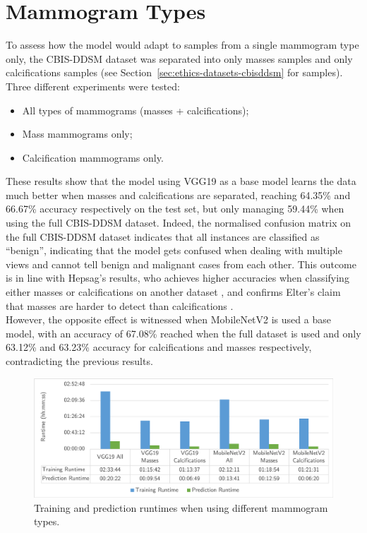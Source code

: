 \section{Mammogram Types}

To assess how the model would adapt to samples from a single mammogram type only, the CBIS-DDSM dataset was separated into only masses samples and only calcifications samples (see Section~\ref{sec:ethics-datasets-cbisddsm} for samples). Three different experiments were tested:
\begin{itemize}
    \item All types of mammograms (masses + calcifications);
    \item Mass mammograms only;
    \item Calcification mammograms only.
\end{itemize}



These results show that the model using VGG19 as a base model learns the data much better when masses and calcifications are separated, reaching 64.35\% and 66.67\% accuracy respectively on the test set, but only managing 59.44\% when using the full CBIS-DDSM dataset. Indeed, the normalised confusion matrix on the full CBIS-DDSM dataset indicates that all instances are classified as ``benign'', indicating that the model gets confused when dealing with multiple views and cannot tell benign and malignant cases from each other. This outcome is in line with Hepsag's results, who achieves higher accuracies when classifying either masses or calcifications on another dataset \citep{Hepsag2017}, and confirms Elter's claim that masses are harder to detect than calcifications \citep{Elter2009}.\\

However, the opposite effect is witnessed when MobileNetV2 is used a base model, with an accuracy of 67.08\% reached when the full dataset is used and only 63.12\% and 63.23\% accuracy for calcifications and masses respectively, contradicting the previous results.

\begin{figure}[ht]
\centerline{\includegraphics[width=\textwidth]{figures/evaluation/mammogram_type_experiment/runtimes.png}}
\caption{\label{fig:evaluation-mammogram_type_experiment-runtimes.png}Training and prediction runtimes when using different mammogram types.}
\end{figure}

